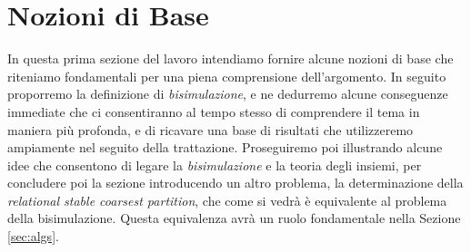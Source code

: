 \section{Nozioni di Base}
\label{sec:base}

In questa prima sezione del lavoro intendiamo fornire alcune nozioni di base che riteniamo fondamentali per una piena comprensione dell'argomento. In seguito proporremo la definizione di \emph{bisimulazione}, e ne dedurremo alcune conseguenze immediate che ci consentiranno al tempo stesso di comprendere il tema in maniera più profonda, e di ricavare una base di risultati che utilizzeremo ampiamente nel seguito della trattazione. Proseguiremo poi illustrando alcune idee che consentono di legare la \emph{bisimulazione} e la teoria degli insiemi, per concludere poi la sezione introducendo un altro problema, la determinazione della \emph{relational stable coarsest partition}, che come si vedrà è equivalente al problema della bisimulazione. Questa equivalenza avrà un ruolo fondamentale nella Sezione \ref{sec:algs}.







